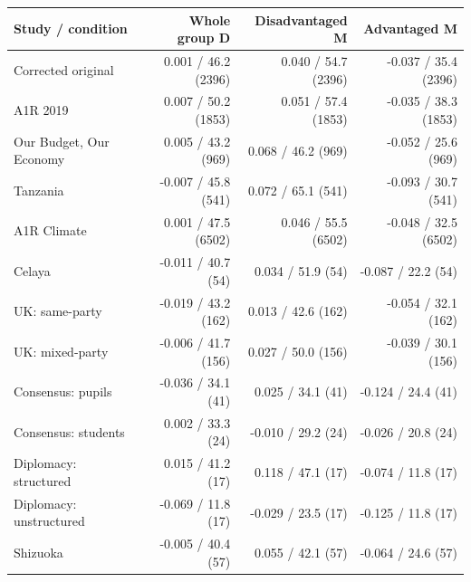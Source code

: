 
\begin{tabular}{lrrr}
\toprule
Study / condition & Whole group D & Disadvantaged M & Advantaged M\\
\midrule
Corrected original & 0.001 / 46.2 (2396) & 0.040 / 54.7 (2396) & -0.037 / 35.4 (2396)\\
A1R 2019 & 0.007 / 50.2 (1853) & 0.051 / 57.4 (1853) & -0.035 / 38.3 (1853)\\
Our Budget, Our Economy & 0.005 / 43.2 (969) & 0.068 / 46.2 (969) & -0.052 / 25.6 (969)\\
Tanzania & -0.007 / 45.8 (541) & 0.072 / 65.1 (541) & -0.093 / 30.7 (541)\\
A1R Climate & 0.001 / 47.5 (6502) & 0.046 / 55.5 (6502) & -0.048 / 32.5 (6502)\\
\addlinespace
Celaya & -0.011 / 40.7 (54) & 0.034 / 51.9 (54) & -0.087 / 22.2 (54)\\
UK: same-party & -0.019 / 43.2 (162) & 0.013 / 42.6 (162) & -0.054 / 32.1 (162)\\
UK: mixed-party & -0.006 / 41.7 (156) & 0.027 / 50.0 (156) & -0.039 / 30.1 (156)\\
Consensus: pupils & -0.036 / 34.1 (41) & 0.025 / 34.1 (41) & -0.124 / 24.4 (41)\\
Consensus: students & 0.002 / 33.3 (24) & -0.010 / 29.2 (24) & -0.026 / 20.8 (24)\\
\addlinespace
Diplomacy: structured & 0.015 / 41.2 (17) & 0.118 / 47.1 (17) & -0.074 / 11.8 (17)\\
Diplomacy: unstructured & -0.069 / 11.8 (17) & -0.029 / 23.5 (17) & -0.125 / 11.8 (17)\\
Shizuoka & -0.005 / 40.4 (57) & 0.055 / 42.1 (57) & -0.064 / 24.6 (57)\\
\bottomrule
\end{tabular}
